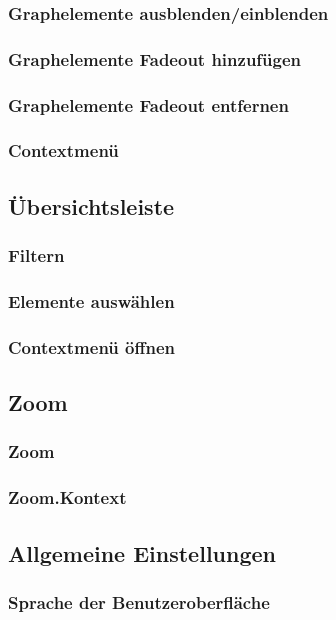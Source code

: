 \documentclass[enabledeprecatedfontcommands,fontsize=11pt,paper=a4,twoside]{scrartcl}
\begin{document}
		\subsubsection{Graphelemente ausblenden/einblenden}
		\subsubsection{Graphelemente Fadeout hinzufügen}
		\subsubsection{Graphelemente Fadeout entfernen}
		
		\subsubsection{Contextmenü}
	
	\subsection{Übersichtsleiste} \label{overwiew}
		\subsubsection{Filtern}
		\subsubsection{Elemente auswählen}
		\subsubsection{Contextmenü öffnen}
		
	\subsection{Zoom} \label{zoom}
		\subsubsection{Zoom}
		\subsubsection{Zoom.Kontext}
	\subsection{Allgemeine Einstellungen} \label{settings}
		\subsubsection{Sprache der Benutzeroberfläche}
\end{document}
